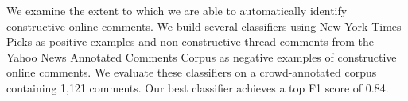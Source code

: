 We examine the extent to which we are able to automatically identify constructive online comments. We build several classifiers using New York Times Picks as positive examples and non-constructive thread comments from the Yahoo News Annotated Comments Corpus as negative examples of constructive online comments. We evaluate these classifiers on a crowd-annotated corpus containing 1,121 comments. Our best classifier achieves a top F1 score of 0.84.
